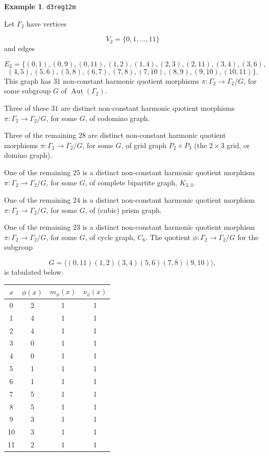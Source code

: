 \documentclass[12pt,letterpaper]{article}
\theoremstyle{definition}
\newtheorem{example}[theorem]{Example}
\DeclareMathOperator{\Aut}{Aut}
\begin{document}
\begin{example}%
\label{example:d3reg12m}
  {\tt d3reg12m}\newline
{\rm  
Let $\Gamma_2$ have vertices

\[
V_2=\{0,1,\dots,11\}
\]
and edges

\[
E_2 = \{
(0, 1), (0, 9), (0, 11), (1, 2), (1, 4), (2, 3), (2, 11), (3, 4), (3, 6),
\]
\[
(4, 5), (5, 6), (5, 8), (6, 7), (7, 8), (7, 10), (8, 9), (9, 10), (10, 11)
\}.
\]
This graph has $31$ non-constant harmonic quotient
morphisms $\pi: \Gamma_2\to \Gamma_2/G$, for some subgroup
$G$ of $\Aut(\Gamma_2)$.

Three of these $31$ are distinct non-constant harmonic quotient
morphisms $\pi: \Gamma_2\to \Gamma_2/G$, for some $G$, of
codomino graph.

Three of the remaining $28$ are distinct non-constant harmonic quotient
morphisms $\pi: \Gamma_2\to \Gamma_2/G$, for some $G$, of
grid graph $P_2\times P_3$ (the $2\times 3$ grid, or domino graph).

One of the remaining $25$ is a distinct non-constant harmonic quotient
morphism $\pi: \Gamma_2\to \Gamma_2/G$, for some $G$, of
complete bipartite graph, $K_{3,3}$.

One of the remaining $24$ is a distinct non-constant harmonic quotient
morphism $\pi: \Gamma_2\to \Gamma_2/G$, for some $G$, of
(cubic) prism graph.

One of the remaining $23$ is a distinct non-constant harmonic quotient
morphism $\pi: \Gamma_2\to \Gamma_2/G$, for some $G$, of
cycle graph, $C_6$.
The quotient $\phi: \Gamma_2\to \Gamma_2/G$ for the subgroup

\[
G=\langle (0,11)(1,2)(3,4)(5,6)(7,8)(9,10) \rangle,
\]
is tabulated below. 

\begin{center}
\begin{tabular}{c|c|c|c}  
  $x$ & $\phi(x)$ & $m_\phi(x)$ & $\nu_\phi(x)$ \\ \hline
  0   &    2   &        1         &  1   \\ 
  1   &    4   &        1         &  1  \\ 
  2   &    4   &        1         &  1  \\ 
  3   &    0   &        1         &  1  \\ 
  4   &    0   &        1         &  1   \\ 
  5   &    1   &        1         &  1    \\ 
  6   &    1   &        1         &  1   \\ 
  7   &    5   &        1         &  1   \\
  8   &    5   &        1         &  1   \\
  9   &    3   &        1         &  1   \\
  10  &    3   &        1         &  1   \\
  11  &    2   &        1         &  1   \\ 
\end{tabular}
\end{center}

}
\end{example}
\end{document}
